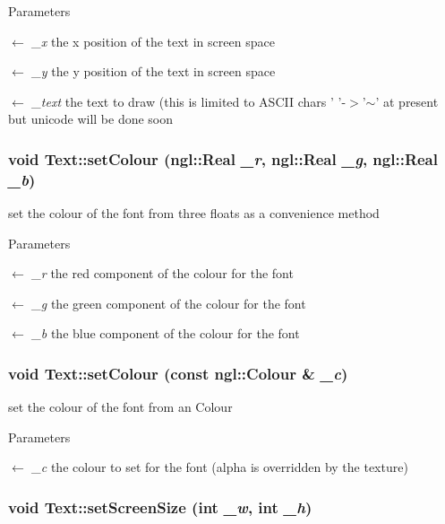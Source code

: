 \begin{DoxyParams}{Parameters}
\item[\mbox{$\leftarrow$} {\em \_\-x}]the x position of the text in screen space \item[\mbox{$\leftarrow$} {\em \_\-y}]the y position of the text in screen space \item[\mbox{$\leftarrow$} {\em \_\-text}]the text to draw (this is limited to ASCII chars ' '-\/$>$'$\sim$' at present but unicode will be done soon \end{DoxyParams}
\hypertarget{classText_ae2ce0fc28fdfccc2842487d5be64e12a}{
\subsubsection[{setColour}]{\setlength{\rightskip}{0pt plus 5cm}void Text::setColour (ngl::Real {\em \_\-r}, \/  ngl::Real {\em \_\-g}, \/  ngl::Real {\em \_\-b})}}
\label{classText_ae2ce0fc28fdfccc2842487d5be64e12a}


set the colour of the font from three floats as a convenience method 
\begin{DoxyParams}{Parameters}
\item[\mbox{$\leftarrow$} {\em \_\-r}]the red component of the colour for the font \item[\mbox{$\leftarrow$} {\em \_\-g}]the green component of the colour for the font \item[\mbox{$\leftarrow$} {\em \_\-b}]the blue component of the colour for the font \end{DoxyParams}
\hypertarget{classText_ad898e1ff3c2221029c115ed5de7f1b72}{
\subsubsection[{setColour}]{\setlength{\rightskip}{0pt plus 5cm}void Text::setColour (const ngl::Colour \& {\em \_\-c})}}
\label{classText_ad898e1ff3c2221029c115ed5de7f1b72}


set the colour of the font from an Colour 
\begin{DoxyParams}{Parameters}
\item[\mbox{$\leftarrow$} {\em \_\-c}]the colour to set for the font (alpha is overridden by the texture) \end{DoxyParams}
\hypertarget{classText_adf20a23bc781824e83dc50c121f56aea}{
\subsubsection[{setScreenSize}]{\setlength{\rightskip}{0pt plus 5cm}void Text::setScreenSize (int {\em \_\-w}, \/  int {\em \_\-h})}}
\label{classText_adf20a23bc781824e83dc50c121f56aea}


